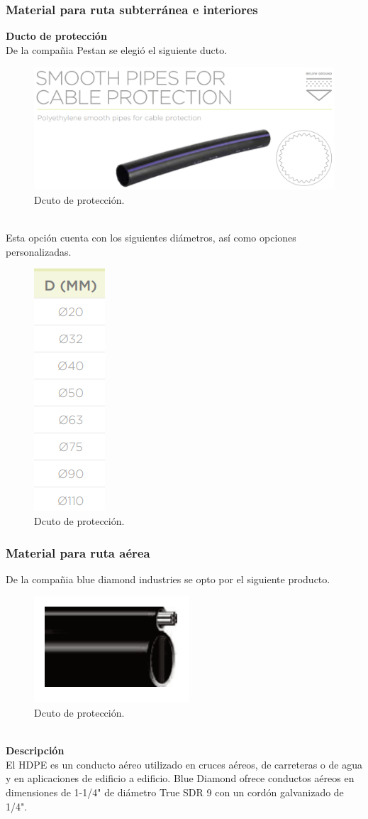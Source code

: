 \documentclass[12pt,letterpaper]{article}
\begin{document}
\subsubsection{Material para ruta subterránea e interiores}
\textbf{Ducto de protección}
\\
De la compañia Pestan se elegió el siguiente ducto.
\begin{figure}[ht]
    \centering
    \includegraphics[width=.5\textwidth]{f13.png}
    \caption{Dcuto de protección.}
\end{figure}
\\
Esta opción cuenta con los siguientes diámetros, así como opciones personalizadas.
\begin{figure}[ht]
    \centering
    \includegraphics[width=.1\textwidth]{f14.png}
    \caption{Dcuto de protección.}
\end{figure}

\subsubsection{Material para ruta aérea}
De la compañia blue diamond industries se opto por el siguiente producto.
\begin{figure}[ht]
    \centering
    \includegraphics[width=.5\textwidth]{f15.png}
    \caption{Dcuto de protección.}
\end{figure}
\\
\textbf{Descripción}
\\
El HDPE es un conducto aéreo utilizado en cruces aéreos, de carreteras o de agua 
y en aplicaciones de edificio a edificio. Blue Diamond ofrece conductos aéreos en 
dimensiones de 1-1/4" de diámetro True SDR 9 con un cordón galvanizado de 1/4".
\end{document}
